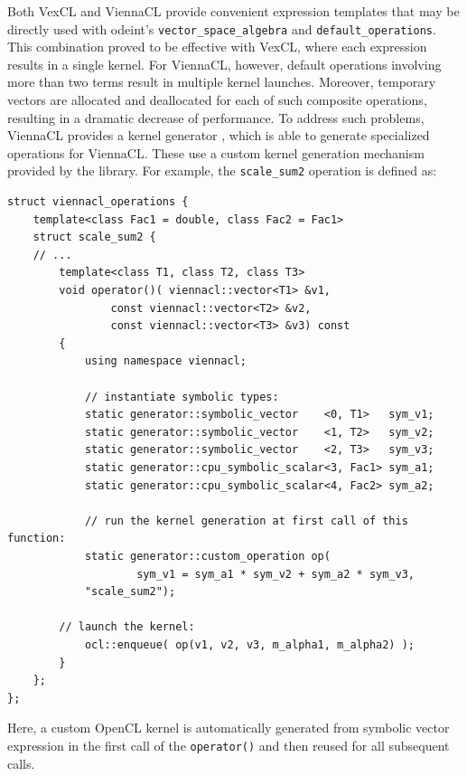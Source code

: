 \documentclass[final]{siamltex}
\newcommand{\code}[1]{\lstinline|#1|}
\begin{document}
Both VexCL and ViennaCL provide convenient expression templates that
may be directly used with odeint's \code{vector_space_algebra} and
\code{default_operations}. This combination proved to be 
effective with VexCL, where each expression results in a single
kernel. For ViennaCL, however, default operations involving more than two
terms result in multiple kernel launches.  Moreover, temporary vectors
are allocated and deallocated for each of such composite operations, resulting in a dramatic decrease of performance.
To address such problems, ViennaCL provides a kernel generator \cite{tillet:kernel-generator}, which is able to generate
specialized operations for ViennaCL. These use a custom kernel
generation mechanism provided by the library.  For example,
the \code{scale_sum2} operation is defined as:
\begin{lstlisting}
struct viennacl_operations {
    template<class Fac1 = double, class Fac2 = Fac1>
    struct scale_sum2 {
	// ...
        template<class T1, class T2, class T3>
        void operator()( viennacl::vector<T1> &v1,
                const viennacl::vector<T2> &v2,
                const viennacl::vector<T3> &v3) const
        {
            using namespace viennacl;

            // instantiate symbolic types:
            static generator::symbolic_vector    <0, T1>   sym_v1;
            static generator::symbolic_vector    <1, T2>   sym_v2;
            static generator::symbolic_vector    <2, T3>   sym_v3;
            static generator::cpu_symbolic_scalar<3, Fac1> sym_a1;
            static generator::cpu_symbolic_scalar<4, Fac2> sym_a2;

            // run the kernel generation at first call of this function:
            static generator::custom_operation op(
                    sym_v1 = sym_a1 * sym_v2 + sym_a2 * sym_v3,
		    "scale_sum2");

	    // launch the kernel:
            ocl::enqueue( op(v1, v2, v3, m_alpha1, m_alpha2) );
        }
    };
};
\end{lstlisting} %
Here, a custom OpenCL kernel is automatically generated from symbolic vector expression
in the first call of the \code{operator()} and then reused for all subsequent calls.
\end{document}
